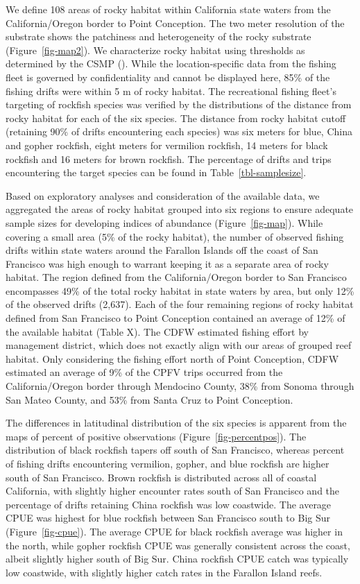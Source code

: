 \documentclass[
  12pt,
  authoryear,
  preprint,
  3p]{elsarticle}
\begin{document}
We define 108 areas of rocky habitat within California state waters from
the California/Oregon border to Point Conception. The two meter
resolution of the substrate shows the patchiness and heterogeneity of
the rocky substrate (Figure~\ref{fig-map2}). We characterize rocky
habitat using thresholds as determined by the CSMP
(\citet{CSUMB:2014:CSM}). While the location-specific data from the
fishing fleet is governed by confidentiality and cannot be displayed
here, 85\% of the fishing drifts were within 5 m of rocky habitat. The
recreational fishing fleet's targeting of rockfish species was verified
by the distributions of the distance from rocky habitat for each of the
six species. The distance from rocky habitat cutoff (retaining 90\% of
drifts encountering each species) was six meters for blue, China and
gopher rockfish, eight meters for vermilion rockfish, 14 meters for
black rockfish and 16 meters for brown rockfish. The percentage of
drifts and trips encountering the target species can be found in
Table~\ref{tbl-samplesize}.

Based on exploratory analyses and consideration of the available data,
we aggregated the areas of rocky habitat grouped into six regions to
ensure adequate sample sizes for developing indices of abundance
(Figure~\ref{fig-map}). While covering a small area (5\% of the rocky
habitat), the number of observed fishing drifts within state waters
around the Farallon Islands off the coast of San Francisco was high
enough to warrant keeping it as a separate area of rocky habitat. The
region defined from the California/Oregon border to San Francisco
encompasses 49\% of the total rocky habitat in state waters by area, but
only 12\% of the observed drifts (2,637). Each of the four remaining
regions of rocky habitat defined from San Francisco to Point Conception
contained an average of 12\% of the available habitat (Table X). The
CDFW estimated fishing effort by management district, which does not
exactly align with our areas of grouped reef habitat. Only considering
the fishing effort north of Point Conception, CDFW estimated an average
of 9\% of the CPFV trips occurred from the California/Oregon border
through Mendocino County, 38\% from Sonoma through San Mateo County, and
53\% from Santa Cruz to Point Conception.

The differences in latitudinal distribution of the six species is
apparent from the maps of percent of positive observations
(Figure~\ref{fig-percentpos}). The distribution of black rockfish tapers
off south of San Francisco, whereas percent of fishing drifts
encountering vermilion, gopher, and blue rockfish are higher south of
San Francisco. Brown rockfish is distributed across all of coastal
California, with slightly higher encounter rates south of San Francisco
and the percentage of drifts retaining China rockfish was low coastwide.
The average CPUE was highest for blue rockfish between San Francisco
south to Big Sur (Figure~\ref{fig-cpue}). The average CPUE for black
rockfish average was higher in the north, while gopher rockfish CPUE was
generally consistent across the coast, albeit slightly higher south of
Big Sur. China rockfish CPUE catch was typically low coastwide, with
slightly higher catch rates in the Farallon Island reefs.
\end{document}

